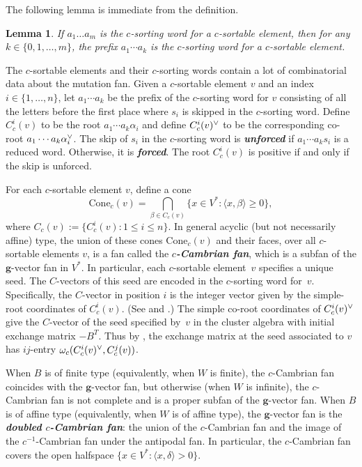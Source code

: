 \documentclass{amsart}
\newtheorem{lemma}[proposition]{Lemma}
\theoremstyle{definition}
\theoremstyle{remark}
\numberwithin{equation}{section}
\newcommand{\newword}[1]{\textbf{\emph{#1}}}
\newcommand{\set}[1]{{\lbrace #1 \rbrace}}
\newcommand{\br}[1]{{\langle #1 \rangle}}
\newcommand{\ck}{\spcheck}
\newcommand{\0}{{\mathbf{0}}}
\newcommand{\Cone}{\mathrm{Cone}}
\newcommand{\g}{\mathbf{g}}
\newcommand{\RSChar}{\Phi}
\newcommand{\RS}{\RSChar}
\newcommand{\sayD}[1]{\say[D]{#1}}
\begin{document}
The following lemma is immediate from the definition.
\begin{lemma}\label{any prefix}
If $a_1\ldots a_m$ is the $c$-sorting word for a $c$-sortable element, then for any $k\in\set{0,1,\ldots,m}$, the prefix $a_1\cdots a_k$ is the $c$-sorting word for a $c$-sortable element.
\end{lemma}


The $c$-sortable elements and their $c$-sorting words contain a lot of combinatorial data about the mutation fan.
Given a $c$-sortable element $v$ and an index $i\in\set{1,\ldots,n}$, let $a_1\cdots a_k$ be the prefix of the $c$-sorting word for $v$ consisting of all the letters before the first place where $s_i$ is skipped in the $c$-sorting word.
Define $C_c^i(v)$ to be the root $a_1\cdots a_k\alpha_i$ and define $C_c^i(v)\ck$ to be the corresponding co-root $a_1\cdots a_k\alpha\ck_i$.
The skip of $s_i$ in the $c$-sorting word is \newword{unforced} if $a_1\cdots a_ks_i$ is a reduced word.
Otherwise, it is \newword{forced}.
The root $C_c^i(v)$ is positive if and only if the skip is unforced.

For each $c$-sortable element $v$, define a cone  
\[\Cone_c(v)=\bigcap_{\beta \in C_c(v)}\set{x\in V^*:\br{x,\beta} \geq 0},\]
where $C_c(v):=\{C_c^i(v):1\le i\le n\}$.
In general acyclic (but not necessarily affine) type, the union of these cones $\Cone_c(v)$ and their faces, over all $c$-sortable elements $v$, is a fan called the \newword{$c$-Cambrian fan}, which is a subfan of the $\g$-vector fan in $V^*$.
In particular, each $c$-sortable element~$v$ specifies a unique seed.
The $C$-vectors of this seed are encoded in the $c$-sorting word for~$v$.
Specifically, the $C$-vector in position $i$ is the integer vector given by the simple-root coordinates of $C_c^i(v)$.
(See \cite[Therem~1.1]{framework} and \cite[Theorem~5.12]{framework}.)
The simple co-root coordinates of $C_c^i(v)\ck$ give the $C$-vector of the seed specified by~$v$ in the cluster algebra with initial exchange matrix $-B^T$.
Thus by \cite[Theorem~1.1]{framework}, the exchange matrix at the seed associated to $v$ has $ij$-entry $\omega_c(C_c^i(v)\ck,C_c^j(v))$.

When $B$ is of finite type (equivalently, when $W$ is finite), the $c$-Cambrian fan coincides with the $\g$-vector fan, but otherwise (when $W$ is infinite), the $c$-Cambrian fan is not complete and is a proper subfan of the $\g$-vector fan.
When $B$ is of affine type (equivalently, when $W$ is of affine type), the $\g$-vector fan is the \newword{doubled $c$-Cambrian fan}: the union of the \mbox{$c$-Cambrian} fan and the image of the \mbox{$c^{-1}$-Cambrian} fan under the antipodal fan\sayD{"antipodal map"?}. %
In particular, the $c$-Cambrian fan covers the open halfspace $\set{x\in V^*:\br{x,\delta}>0}$.
\end{document}
